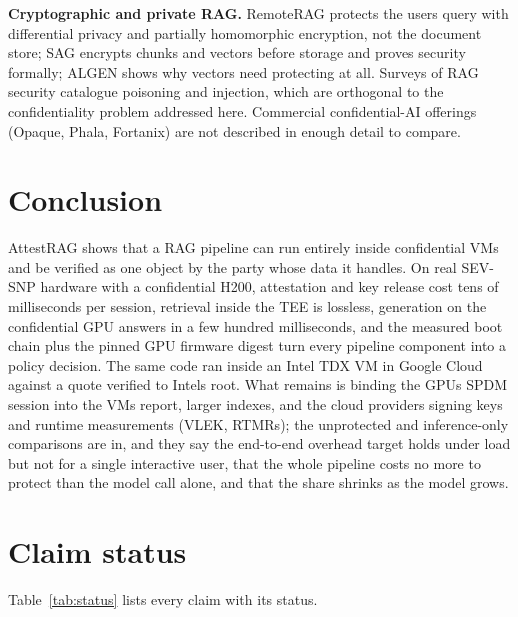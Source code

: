\documentclass[letterpaper,twocolumn,10pt]{article}
\begin{document}
\textbf{Cryptographic and private RAG.} RemoteRAG \cite{cheng2025remoterag} protects the user\textquotesingle s query with differential privacy and partially homomorphic encryption, not the document store; SAG \cite{zhou2025sag} encrypts chunks and vectors before storage and proves security formally; ALGEN \cite{chen2025algen} shows why vectors need protecting at all. Surveys of RAG security \cite{mu2026securerag,palanisamy2026ragsp} catalogue poisoning and injection, which are orthogonal to the confidentiality problem addressed here. Commercial confidential-AI offerings (Opaque, Phala, Fortanix) are not described in enough detail to compare.

\section{Conclusion}\label{conclusion}

AttestRAG shows that a RAG pipeline can run entirely inside confidential VMs and be verified as one object by the party whose data it handles. On real SEV-SNP hardware with a confidential H200, attestation and key release cost tens of milliseconds per session, retrieval inside the TEE is lossless, generation on the confidential GPU answers in a few hundred milliseconds, and the measured boot chain plus the pinned GPU firmware digest turn every pipeline component into a policy decision. The same code ran inside an Intel TDX VM in Google Cloud against a quote verified to Intel\textquotesingle s root. What remains is binding the GPU\textquotesingle s SPDM session into the VM\textquotesingle s report, larger indexes, and the cloud providers\textquotesingle{} signing keys and runtime measurements (VLEK, RTMRs); the unprotected and inference-only comparisons are in, and they say the end-to-end overhead target holds under load but not for a single interactive user, that the whole pipeline costs no more to protect than the model call alone, and that the share shrinks as the model grows.

\appendix

\section{Claim status}\label{claim-status}

Table~\ref{tab:status} lists every claim with its status.
\end{document}

